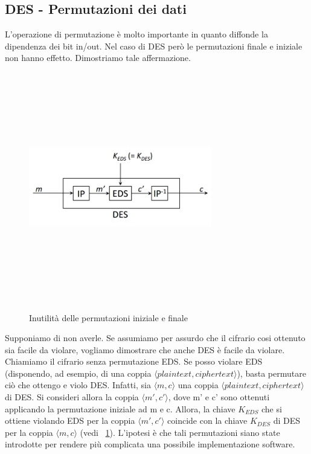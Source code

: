\subsection{DES - Permutazioni dei dati}
L'operazione di permutazione è molto importante in quanto diffonde la dipendenza dei bit in/out. Nel caso di DES però le permutazioni finale e iniziale non hanno effetto. Dimostriamo tale affermazione. \newline
\begin{figure}[htbp]
	\centering%
	\subfigure%
	{\includegraphics[height=10cm, width=8cm, keepaspectratio]{Immagini/Capitolo2/des_perm_3.png}}
	\caption{Inutilità delle permutazioni iniziale e finale \label{fig:des_perm_3}} 	
\end{figure}
Supponiamo di non averle. Se assumiamo per assurdo che il cifrario cosi ottenuto sia facile da violare, vogliamo dimostrare che anche DES è facile da violare. Chiamiamo il cifrario senza permutazione EDS. Se posso violare EDS (disponendo, ad esempio, di una coppia $\langle plaintext, ciphertext \rangle$), basta permutare ciò che ottengo e violo DES. Infatti, sia $\langle m, c \rangle$ una coppia $\langle plaintext, ciphertext \rangle$ di DES. Si consideri allora la coppia $\langle m', c' \rangle$, dove m' e c' sono ottenuti applicando la permutazione iniziale ad m e c. Allora, la chiave $K_{EDS}$ che si ottiene violando EDS per la
coppia $\langle m', c' \rangle$ coincide con la chiave $K_{DES}$ di DES per la
coppia $\langle m, c \rangle$ (vedi \figurename ~\ref{fig:des_perm_3}). L'ipotesi è che tali permutazioni siano state introdotte per rendere più complicata una possibile implementazione software.
